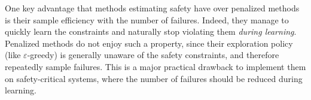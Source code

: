 One key advantage that methods estimating safety have over penalized methods is their sample efficiency with the number of failures. Indeed, they manage to quickly learn the constraints and naturally stop violating them\emph{ during learning}. Penalized methods do not enjoy such a property, since their exploration policy (like $\varepsilon$-greedy) is generally unaware of the safety constraints, and therefore repeatedly sample failures. This is a major practical drawback to implement them on safety-critical systems, where the number of failures should be reduced during learning.